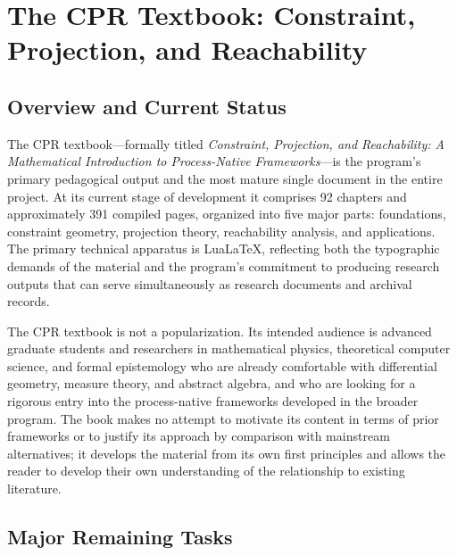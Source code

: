 \documentclass[11pt, oneside]{book}
\theoremstyle{definition}
\theoremstyle{remark}
\begin{document}
\chapter{The CPR Textbook: Constraint, Projection, and Reachability}

\section{Overview and Current Status}

The CPR textbook—formally titled \textit{Constraint, Projection, and Reachability: A Mathematical Introduction to Process-Native Frameworks}—is the program's primary pedagogical output and the most mature single document in the entire project. At its current stage of development it comprises 92 chapters and approximately 391 compiled pages, organized into five major parts: foundations, constraint geometry, projection theory, reachability analysis, and applications. The primary technical apparatus is LuaLaTeX, reflecting both the typographic demands of the material and the program's commitment to producing research outputs that can serve simultaneously as research documents and archival records.

The CPR textbook is not a popularization. Its intended audience is advanced graduate students and researchers in mathematical physics, theoretical computer science, and formal epistemology who are already comfortable with differential geometry, measure theory, and abstract algebra, and who are looking for a rigorous entry into the process-native frameworks developed in the broader program. The book makes no attempt to motivate its content in terms of prior frameworks or to justify its approach by comparison with mainstream alternatives; it develops the material from its own first principles and allows the reader to develop their own understanding of the relationship to existing literature.

\section{Major Remaining Tasks}
\end{document}
